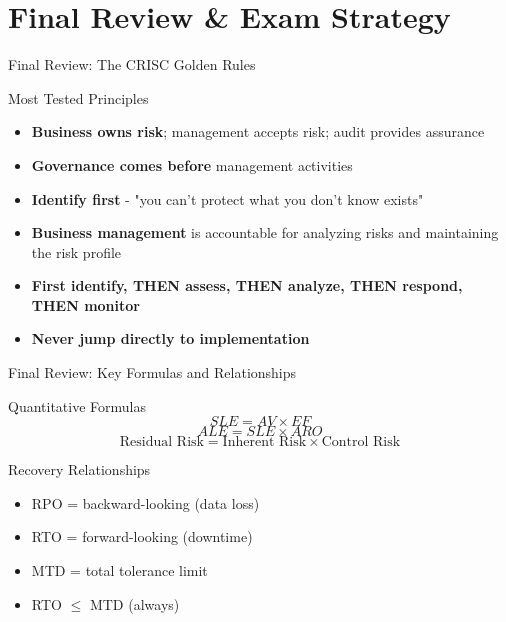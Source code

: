 \documentclass{beamer}
\begin{document}
	\section{Final Review \& Exam Strategy}
	
	\begin{frame}{Final Review: The CRISC Golden Rules}
		\begin{block}{Most Tested Principles}
			\begin{itemize}
				\item \textbf{Business owns risk}; management accepts risk; audit provides assurance
				\item \textbf{Governance comes before} management activities
				\item \textbf{Identify first} - "you can't protect what you don't know exists"
				\item \textbf{Business management} is accountable for analyzing risks and maintaining the risk profile
				\item \textbf{First identify, THEN assess, THEN analyze, THEN respond, THEN monitor}
				\item \textbf{Never jump directly to implementation}
			\end{itemize}
		\end{block}
	\end{frame}
	
	\begin{frame}{Final Review: Key Formulas and Relationships}
		\begin{block}{Quantitative Formulas}
			\[ SLE = AV \times EF \]
			\[ ALE = SLE \times ARO \]
			\[ \text{Residual Risk} = \text{Inherent Risk} \times \text{Control Risk} \]
		\end{block}
		\begin{block}{Recovery Relationships}
			\begin{itemize}
				\item RPO = backward-looking (data loss)
				\item RTO = forward-looking (downtime)
				\item MTD = total tolerance limit
				\item RTO $\le$ MTD (always)
			\end{itemize}
		\end{block}
	\end{frame}
	
\end{document}
